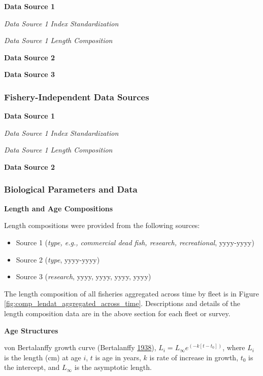 \documentclass[12pt,]{article}
\begin{document}
\textbf{Data Source 1}

\emph{Data Source 1 Index Standardization}

\emph{Data Source 1 Length Composition}

\textbf{Data Source 2}

\textbf{Data Source 3}

\subsubsection{Fishery-Independent Data
Sources}\label{fishery-independent-data-sources}

\textbf{Data Source 1}

\emph{Data Source 1 Index Standardization}

\emph{Data Source 1 Length Composition}

\textbf{Data Source 2}

\subsubsection{Biological Parameters and
Data}\label{biological-parameters-and-data}

\textbf{Length and Age Compositions}

Length compositions were provided from the following sources:

\begin{itemize}[noitemsep,nolistsep,topsep=0pt]
  \item Source 1 (\emph{type, e.g., commercial dead fish, research, recreational}, yyyy-yyyy)    
  \item Source 2 (\emph{type}, yyyy-yyyy)    
  \item Source 3 (\emph{research}, yyyy, yyyy, yyyy, yyyy) 
\end{itemize}

The length composition of all fisheries aggregated across time by fleet
is in Figure \ref{fig:comp_lendat_aggregated_across_time}. Descriptions
and details of the length composition data are in the above section for
each fleet or survey.

\vspace{.5cm} \textbf{Age Structures}

von Bertalanffy growth curve (Bertalanffy
\protect\hyperlink{ref-vonB1938}{1938}),
\(L_i = L_{\infty}e^{(-k[t-t_0])}\), where \(L_i\) is the length (cm) at
age \(i\), \(t\) is age in years, \(k\) is rate of increase in growth,
\(t_0\) is the intercept, and \(L_{\infty}\) is the asymptotic length.
\end{document}

